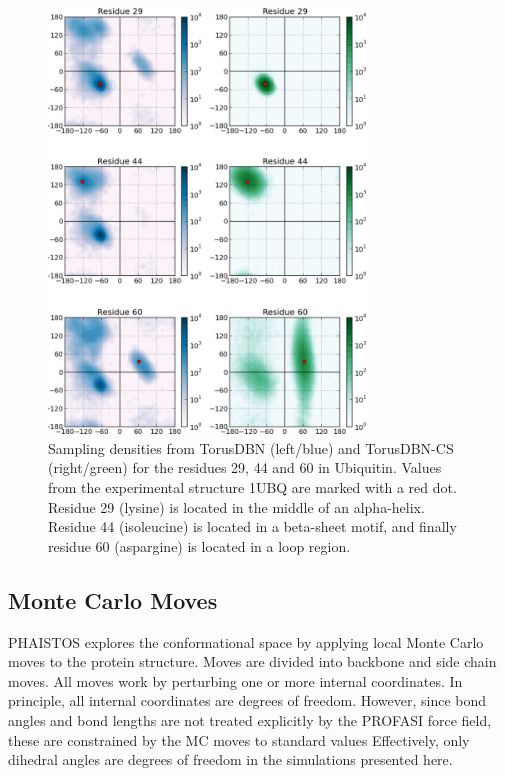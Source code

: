 \begin{figure}
    \centering
    \includegraphics[width=0.75\textwidth]{figures/torus_versions.pdf}
    \caption{Sampling densities from TorusDBN (left/blue) and TorusDBN-CS (right/green) for the residues 29, 44 and 60 in Ubiquitin. Values from the experimental structure 1UBQ are marked with a red dot. Residue 29 (lysine) is located in the middle of an alpha-helix. Residue 44 (isoleucine) is located in a beta-sheet motif, and finally residue 60 (aspargine) is located in a loop region.}
    \label{fig:torus}
\end{figure}

\subsection{Monte Carlo Moves}

PHAISTOS explores the conformational space by applying local Monte Carlo moves to the protein structure.
Moves are divided into backbone and side chain moves.
All moves work by perturbing one or more internal coordinates.
In principle, all internal coordinates are degrees of freedom.
However, since bond angles and bond lengths are not treated explicitly by the PROFASI force field, these are constrained by the MC moves to standard values \cite{engh-huber}
Effectively, only dihedral angles are degrees of freedom in the simulations presented here.

